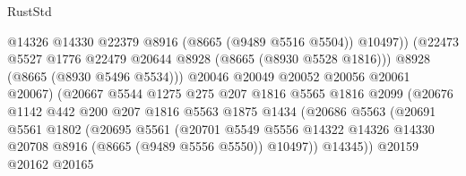 \begin{lexlean}{RustStd}
\begin{coremodule}
                                      @14326
                                      @14330
                                      @22379
                                      @8916
                                      (@8665 (@9489 @5516 @5504))
                                      @10497))
                                  (@22473
                                    @5527
                                    @1776
                                    @22479
                                    @20644
                                    @8928
                                    (@8665 (@8930 @5528 @1816)))
                                  @8928
                                  (@8665 (@8930 @5496 @5534)))
                                @20046
                                @20049
                                @20052
                                @20056
                                @20061
                                @20067)
                              (@20667
                                @5544
                                @1275
                                @275
                                @207
                                @1816
                                @5565
                                @1816
                                @2099
                                (@20676
                                  @1142
                                  @442
                                  @200
                                  @207
                                  @1816
                                  @5563
                                  @1875
                                  @1434
                                  (@20686
                                    @5563
                                    (@20691
                                      @5561
                                      @1802
                                      (@20695
                                        @5561
                                        (@20701
                                          @5549
                                          @5556
                                          @14322
                                          @14326
                                          @14330
                                          @20708
                                          @8916
                                          (@8665 (@9489 @5556 @5550))
                                          @10497))
                                      @14345))
                                  @20159
                                  @20162
                                  @20165

\end{coremodule}
\end{lexlean}
